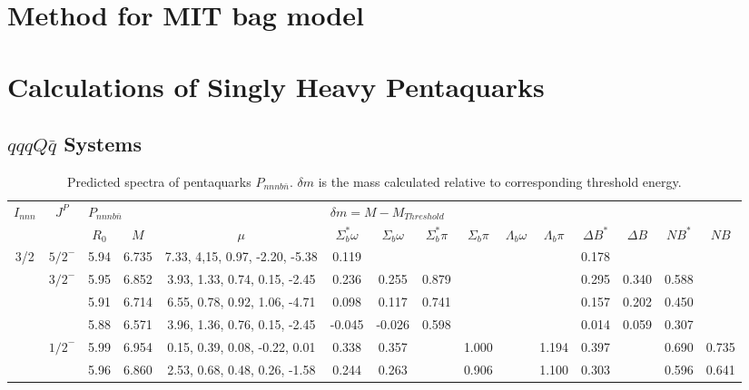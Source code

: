 \documentclass[prd,twocolumn,floatfix,nofootinbib]{revtex4}
\begin{document}
\section{Method for MIT bag model}\label{sec:bagmodel}



\section{Calculations of Singly Heavy Pentaquarks}\label{sec:hadrons}
\subsection{$qqqQ\bar{q}$ Systems}

\renewcommand{\tabcolsep}{0.1cm}
\renewcommand{\arraystretch}{1.0}
\begin{table*}[!htbp]
    \caption{Predicted spectra of pentaquarks $P_{nnnb\bar{n}}$. 
        $\delta m$ is the mass calculated relative to corresponding threshold energy.}
    \label{tab:nnnbn}
    \begin{tabular}{cc|ccc|cccccccccc}
        \bottomrule[1.5pt]\bottomrule[0.5pt]
        \multirow{2}{*}{$I_{nnn}$} &\multirow{2}{*}{$J^{P}$} 
        &\multicolumn{3}{l|}{$P_{nnnb\bar{n}}$} 
        &\multicolumn{10}{l}{$\delta m=M-M_{Threshold}$} \\
        & &$R_{0}$ &$M$ &$\mu$ 
        &$\Sigma_{b}^{\ast}\omega$ &$\Sigma_{b}\omega$ &$\Sigma_{b}^{\ast}\pi$ &$\Sigma_{b}\pi$ &$\Lambda_{b}\omega$ &$\Lambda_{b}\pi$ 
        &$\Delta B^{\ast}$ &$\Delta B$ &$NB^{\ast}$ &$NB$ \\ \hline
        3/2
            &${5/2}^{-}$    &5.94   &6.735  &7.33, 4,15, 0.97, -2.20, -5.38 &0.119 & & & & & &0.178 & & & \\
            &${3/2}^{-}$    &5.95   &6.852  &3.93, 1.33, 0.74, 0.15, -2.45 &0.236 &0.255 &0.879 & & & &0.295 &0.340 &0.588 & \\
            &               &5.91   &6.714  &6.55, 0.78, 0.92, 1.06, -4.71 &0.098 &0.117 &0.741 & & & &0.157 &0.202 &0.450 & \\
            &               &5.88   &6.571  &3.96, 1.36, 0.76, 0.15, -2.45 &-0.045 &-0.026 &0.598 & & & &0.014 &0.059 &0.307 & \\
            &${1/2}^{-}$    &5.99   &6.954  &0.15, 0.39, 0.08, -0.22, 0.01 &0.338 &0.357 & &1.000 & &1.194 &0.397 & &0.690 &0.735 \\
            &               &5.96   &6.860  &2.53, 0.68, 0.48, 0.26, -1.58 &0.244 &0.263 & &0.906 & &1.100 &0.303 & &0.596 &0.641 \\

\end{tabular}
\end{table*}
\end{document}
